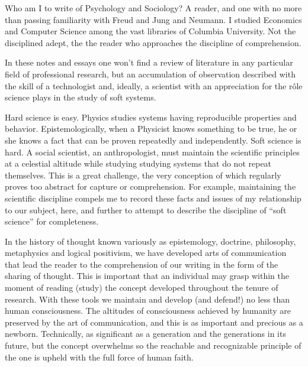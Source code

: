 

Who am I to write of Psychology and Sociology?  A reader, and one with
no more than passing familiarity with Freud and Jung and Neumann.  I
studied Economics and Computer Science among the vast libraries of
Columbia University.  Not the disciplined adept, the the reader who
approaches the discipline of comprehension.  

In these notes and essays one won't find a review of literature in any
particular field of professional research, but an accumulation of
observation described with the skill of a technologist and, ideally, a
scientist with an appreciation for the r\^ole science plays in the
study of soft systems.

Hard science is easy.  Physics studies systems having reproducible
properties and behavior.  Epistemologically, when a Physicist knows
something to be true, he or she knows a fact that can be proven
repeatedly and independently.  Soft science is hard.  A social
scientist, an anthropologist, must maintain the scientific principles
at a celestial altitude while studying studying systems that do not
repeat themselves.  This is a great challenge, the very conception of
which regularly proves too abstract for capture or comprehension.  For
example, maintaining the scientific discipline compels me to record
these facts and issues of my relationship to our subject, here, and
further to attempt to describe the discipline of ``soft science'' for
completeness.

In the history of thought known variously as epistemology, doctrine,
philosophy, metaphysics and logical positivism, we have developed arts
of communication that lead the reader to the comprehension of our
writing in the form of the sharing of thought.  This is important that
an individual may grasp within the moment of reading (study) the
concept developed throughout the tenure of research.  With these tools
we maintain and develop (and defend!) no less than human
consciousness.  The altitudes of consciousness achieved by humanity
are preserved by the art of communication, and this is as important
and precious as a newborn.  Technically, as significant as a
generation and the generations in its future, but the concept
overwhelms so the reachable and recognizable principle of the one is
upheld with the full force of human faith.


\bye
